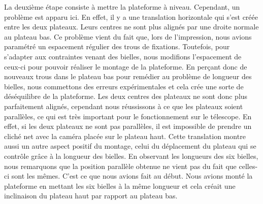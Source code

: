 \documentclass[a4paper,12pt]{article}
\begin{document}
La deuxième étape consiste à mettre la plateforme à niveau.
Cependant, un problème est apparu ici. En effet, il y a une translation horizontale qui s'est créée entre les deux plateaux. Leurs centres ne sont plus alignés par une droite normale au plateau bas.
Ce problème vient du fait que, lors de l'impression, nous avions paramétré un espacement régulier des trous de fixations.
Toutefois, pour s'adapter aux contraintes venant des bielles, nous modifions l'espacement de ceux-ci  pour pouvoir réaliser le montage de la plateforme. 
En perçant donc de nouveaux trous dans le plateau bas pour remédier au problème de longueur des bielles, nous commettons des erreurs expérimentales et cela crée une sorte de déséquilibre de la plateforme. Les deux centres des plateaux ne sont donc plus parfaitement alignés, cependant nous réussissons à ce que les plateaux soient parallèles, ce qui est très important pour le fonctionnement sur le télescope. 
En effet, si les deux plateaux ne sont pas parallèles, il est impossible de prendre un cliché net avec la caméra placée sur le plateau haut. 
Cette translation montre aussi un autre aspect positif du montage, celui du déplacement du plateau qui se contrôle grâce à la longueur des bielles. 
En observant les longueurs des six bielles, nous remarquons que la position parallèle obtenue ne vient pas du fait que celles-ci sont les mêmes. C'est ce que nous avions fait au début. Nous avions monté la plateforme en mettant les six bielles à la même longueur et cela créait une inclinaison du plateau haut par rapport au plateau bas. 
\end{document}
